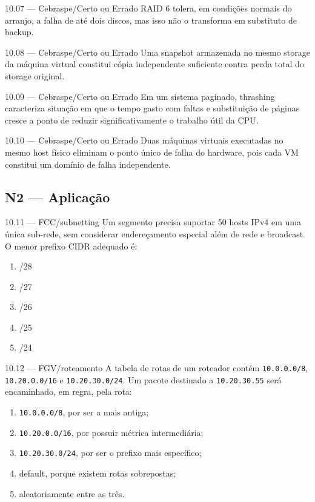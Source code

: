 \begin{questao}{ 10.07 — Cebraspe/Certo ou Errado}
RAID 6 tolera, em condições normais do arranjo, a falha de até dois discos, mas isso não o transforma em substituto de backup.
\end{questao}

\begin{questao}{ 10.08 — Cebraspe/Certo ou Errado}
Uma snapshot armazenada no mesmo storage da máquina virtual constitui cópia independente suficiente contra perda total do storage original.
\end{questao}

\begin{questao}{ 10.09 — Cebraspe/Certo ou Errado}
Em um sistema paginado, thrashing caracteriza situação em que o tempo gasto com faltas e substituição de páginas cresce a ponto de reduzir significativamente o trabalho útil da CPU.
\end{questao}

\begin{questao}{ 10.10 — Cebraspe/Certo ou Errado}
Duas máquinas virtuais executadas no mesmo host físico eliminam o ponto único de falha do hardware, pois cada VM constitui um domínio de falha independente.
\end{questao}

\subsection*{N2 — Aplicação}

\begin{questao}{ 10.11 — FCC/subnetting}
Um segmento precisa suportar 50 hosts IPv4 em uma única sub-rede, sem considerar endereçamento especial além de rede e broadcast. O menor prefixo CIDR adequado é:
\begin{enumerate}[label=\Alph*)]
\item /28
\item /27
\item /26
\item /25
\item /24
\end{enumerate}
\end{questao}

\begin{questao}{ 10.12 — FGV/roteamento}
A tabela de rotas de um roteador contém \texttt{10.0.0.0/8}, \texttt{10.20.0.0/16} e \texttt{10.20.30.0/24}. Um pacote destinado a \texttt{10.20.30.55} será encaminhado, em regra, pela rota:
\begin{enumerate}[label=\Alph*)]
\item \texttt{10.0.0.0/8}, por ser a mais antiga;
\item \texttt{10.20.0.0/16}, por possuir métrica intermediária;
\item \texttt{10.20.30.0/24}, por ser o prefixo mais específico;
\item default, porque existem rotas sobrepostas;
\item aleatoriamente entre as três.
\end{enumerate}
\end{questao}

